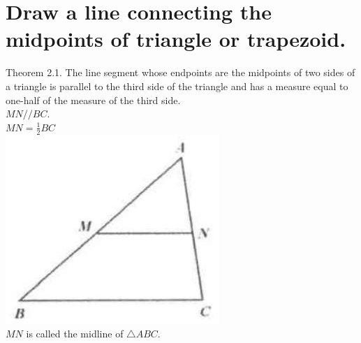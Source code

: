 \documentclass[10pt]{article}
\begin{document}
\section*{Draw a line connecting the midpoints of triangle or trapezoid.}
Theorem 2.1. The line segment whose endpoints are the midpoints of two sides of a triangle is parallel to the third side of the triangle and has a measure equal to one-half of the measure of the third side.\\
\(M N / / B C\).\\
\(M N=\frac{1}{2} B C\)\\
\includegraphics[max width=\textwidth, center]{2025_04_17_97bc1f7e44d93c271a88g-032(2)}\\
\(M N\) is called the midline of \(\triangle A B C\).
\end{document}
